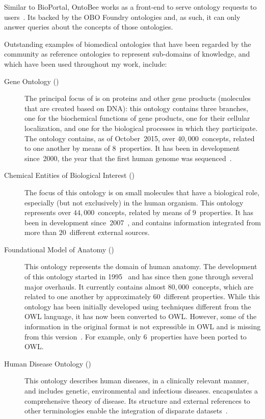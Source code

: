 Similar to BioPortal, OntoBee works as a front-end to serve ontology requests to users~\citep{Xiang2011}. Its backed by the OBO Foundry ontologies and, as such, it can only answer queries about the concepts of those ontologies.

Outstanding examples of biomedical ontologies that have been regarded by the community as reference ontologies to represent sub-domains of knowledge, and which have been used throughout my work, include:
\begin{description}
    \item[Gene Ontology ()] The principal focus of  is on proteins and other gene products (molecules that are created based on DNA): this ontology contains three branches, one for the biochemical functions of gene products, one for their cellular localization, and one for the biological processes in which they participate. The ontology contains, as of October~2015, over $40{,}000$~concepts, related to one another by means of $8$~properties. It has been in development since~2000, the year that the first human genome was sequenced~\citep{Ashburner2000}.
    
    \item[Chemical Entities of Biological Interest ()] The focus of this ontology is on small molecules that have a biological role, especially (but not exclusively) in the human organism. This ontology represents over $44{,}000$~concepts, related by means of $9$~properties. It has been in development since~2007~\citep{Degtyarenko2008a}, and contains information integrated from more than $20$~different external sources.
    
    \item[Foundational Model of Anatomy ()] This ontology represents the domain of human anatomy. The development of this ontology started in 1995~\citep{Rosse1995} and has since then gone through several major overhauls. It currently contains almost $80{,}000$~concepts, which are related to one another by approximately $60$~different properties. While this ontology has been initially developed using techniques different from the OWL language, it has now been converted to OWL. However, some of the information in the original format is not expressible in OWL and is missing from this version~\citep{Golbreich2005a,Golbreich2013}. For example, only $6$~properties have been ported to OWL.
    
    \item[Human Disease Ontology ()] This ontology describes human diseases, in a clinically relevant manner, and includes genetic, environmental and infectious diseases.  encapsulates a comprehensive theory of disease. Its structure and external references to other terminologies enable the integration of disparate datasets~\citep{Osborne2009}.
\end{description}

